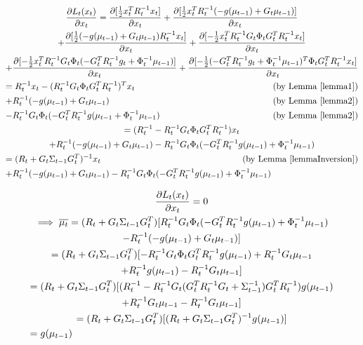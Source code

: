 \begin{multline*}
\frac{\partial L_t(x_t)}{\partial x_t} = \frac{\partial [\frac{1}{2} x_t^T R_t^{-1}x_t]}{\partial x_t} + \frac{\partial [\frac{1}{2} x_t^TR_t^{-1}(-g(\mu_{t-1})+G_t\mu_{t-1})]}{\partial x_t} \\
+ \frac{\partial [\frac{1}{2} (-g(\mu_{t-1})+G_t\mu_{t-1})R_t^{-1}x_t]}{\partial x_t} + \frac{\partial [-\frac{1}{2} x_t^TR_t^{-1}G_t\Phi_tG_t^TR_t^{-1}x_t]}{\partial x_t} \\
+ \frac{\partial [-\frac{1}{2} x_t^TR_t^{-1}G_t\Phi_t(-G_t^TR_t^{-1}g_t + \Phi_t^{-1}\mu_{t-1})]}{\partial x_t} + \frac{\partial [-\frac{1}{2} (-G_t^TR_t^{-1}g_t + \Phi_t^{-1}\mu_{t-1})^T\Phi_tG_t^TR_t^{-1}x_t]}{\partial x_t} \\
= R_t^{-1}x_t - (R_t^{-1}G_t\Phi_tG_t^TR_t^{-1})^Tx_t  \hfill \text{(by Lemma \ref{lemma1})} \\
+ R_t^{-1}(-g(\mu_{t-1}) + G_t\mu_{t-1}) \hfill \text{(by Lemma \ref{lemma2})} \\
-R_t^{-1}G_t\Phi_t(-G_t^TR_t^{-1}g(\mu_{t-1} + \Phi_t^{-1}\mu_{t-1}) \hfill \text{(by Lemma \ref{lemma2})} \\
= (R_t^{-1} - R_t^{-1}G_t\Phi_tG_t^TR_t^{-1})x_t \\
+ R_t^{-1}(-g(\mu_{t-1}) + G_t\mu_{t-1}) - R_t^{-1}G_t\Phi_t(-G_t^TR_t^{-1}g(\mu_{t-1}) + \Phi_t^{-1}\mu_{t-1}) \\
= (R_t + G_t\Sigma_{t-1}G_t^T)^{-1}x_t \hfill \text{(by Lemma \ref{lemmaInversion})} \\
+ R_t^{-1}(-g(\mu_{t-1}) + G_t\mu_{t-1}) - R_t^{-1}G_t\Phi_t(-G_t^TR_t^{-1}g(\mu_{t-1}) + \Phi_t^{-1}\mu_{t-1}) \hfill
\end{multline*}

\begin{multline*}
\frac{\partial L_t(x_t)}{\partial x_t} = 0 \\
\implies \overline{\mu_t} = (R_t + G_t\Sigma_{t-1}G_t^T) [R_t^{-1}G_t\Phi_t(-G_t^TR_t^{-1}g(\mu_{t-1}) + \Phi_t^{-1}\mu_{t-1}) \\ - R_t^{-1}(-g(\mu_{t-1}) + G_t\mu_{t-1})] \\
= (R_t + G_t\Sigma_{t-1}G_t^T) [-R_t^{-1}G_t\Phi_tG_t^TR_t^{-1}g(\mu_{t-1}) + R_t^{-1}G_t\mu_{t-1} \\ + R_t^{-1}g(\mu_{t-1}) - R_t^{-1}G_t\mu_{t-1}] \\
= (R_t + G_t\Sigma_{t-1}G_t^T) [(R_t^{-1} - R_t^{-1}G_t(G_t^TR_t^{-1}G_t + \Sigma_{t-1}^{-1})G_t^TR_t^{-1})g(\mu_{t-1}) \\
+ R_t^{-1}G_t\mu_{t-1} - R_t^{-1}G_t\mu_{t-1}] \\
= (R_t + G_t\Sigma_{t-1}G_t^T)[(R_t + G_t\Sigma_{t-1}G_t^T)^{-1} g(\mu_{t-1})] \\
= g(\mu_{t-1}) \hfill
\end{multline*}

